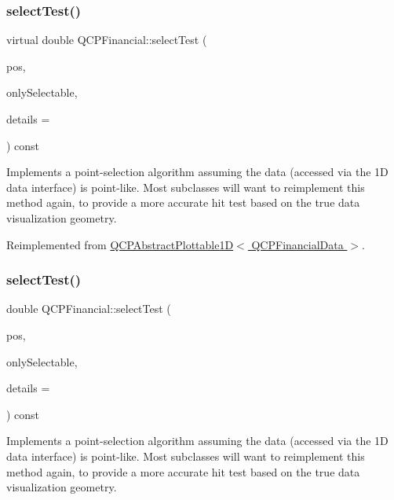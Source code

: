 \subsubsection{\texorpdfstring{select\+Test()}{selectTest()}\hspace{0.1cm}{\footnotesize\ttfamily [1/2]}}
{\footnotesize\ttfamily virtual double Q\+C\+P\+Financial\+::select\+Test (\begin{DoxyParamCaption}\item[{const Q\+PointF \&}]{pos,  }\item[{bool}]{only\+Selectable,  }\item[{Q\+Variant $\ast$}]{details = {} }\end{DoxyParamCaption}) const\hspace{0.3cm}{\ttfamily [virtual]}}

Implements a point-\/selection algorithm assuming the data (accessed via the 1D data interface) is point-\/like. Most subclasses will want to reimplement this method again, to provide a more accurate hit test based on the true data visualization geometry.

Reimplemented from \hyperlink{class_q_c_p_abstract_plottable1_d_a071e2df66ba1746067dfcb5e27947b43}{Q\+C\+P\+Abstract\+Plottable1\+D$<$ Q\+C\+P\+Financial\+Data $>$}.

\mbox{\label{class_q_c_p_financial_aac8e91622ac58330fa9ce81cc8fd40ee}} 
\subsubsection{\texorpdfstring{select\+Test()}{selectTest()}\hspace{0.1cm}{\footnotesize\ttfamily [2/2]}}
{\footnotesize\ttfamily double Q\+C\+P\+Financial\+::select\+Test (\begin{DoxyParamCaption}\item[{const Q\+PointF \&}]{pos,  }\item[{bool}]{only\+Selectable,  }\item[{Q\+Variant $\ast$}]{details = {} }\end{DoxyParamCaption}) const\hspace{0.3cm}{\ttfamily [virtual]}}

Implements a point-\/selection algorithm assuming the data (accessed via the 1D data interface) is point-\/like. Most subclasses will want to reimplement this method again, to provide a more accurate hit test based on the true data visualization geometry.

